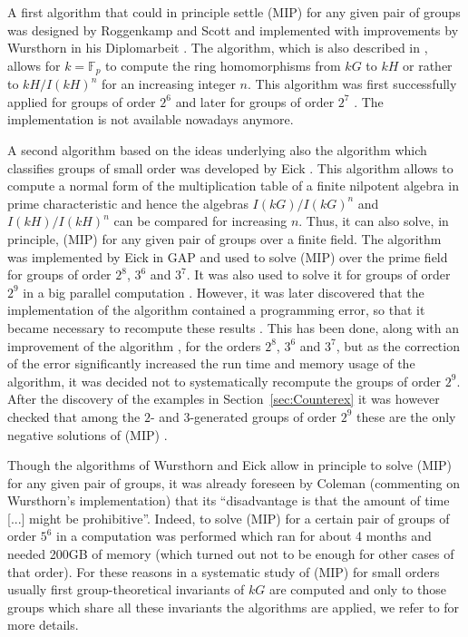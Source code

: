 \documentclass[11pt, a4paper]{amsart}
\theoremstyle{definition}
\begin{document}
A first algorithm that could in principle settle (MIP) for any given pair of groups was designed by Roggenkamp and Scott and implemented with improvements by Wursthorn in his Diplomarbeit \cite{Wursthorn90}. The algorithm, which is also described in \cite{Wursthorn93}, allows for $k = \mathbb{F}_p$ to compute the ring homomorphisms from $kG$ to $kH$ or rather to $kH/I(kH)^n$ for an increasing integer $n$. This algorithm was first successfully applied for groups of order $2^6$ \cite{Wursthorn93} and later for groups of order $2^7$ \cite{BleherKimmerleRoggenkampWursthorn99}. The implementation is not available nowadays anymore.

A second algorithm based on the ideas underlying also the algorithm which classifies groups of small order was developed by Eick \cite{Eick08}. This algorithm allows to compute a normal form of the multiplication table of a finite nilpotent algebra in prime characteristic and hence the algebras $I(kG)/I(kG)^n$ and $I(kH)/I(kH)^n$ can be compared for increasing $n$. Thus, it can also solve, in principle, (MIP) for any given pair of groups over a finite field. The algorithm was implemented by Eick in GAP \cite{ModIsom} and used to solve (MIP) over the prime field for groups of order $2^8$, $3^6$ and $3^7$. It was also used to solve it for groups of order $2^9$ in a big parallel computation \cite{EickKonovalov11}. However, it was later discovered that the implementation of the algorithm contained a programming error, so that it became necessary to recompute these results \cite{MargolisMoede}. This has been done, along with an improvement of the algorithm \cite{ModIsomExt}, for the orders $2^8$, $3^6$ and $3^7$, but as the correction of the error significantly increased the run time and memory usage of the algorithm, it was decided not to systematically recompute the groups of order $2^9$. After the discovery of the examples in Section~\ref{sec:Counterex} it was however checked that among the $2$- and $3$-generated groups of order $2^9$ these are the only negative solutions of (MIP) \cite{MargolisMoede}. 

Though the algorithms of Wursthorn and Eick allow in principle to solve (MIP) for any given pair of groups, it was already foreseen by Coleman (commenting on Wursthorn's implementation) that its ``disadvantage is that the amount of time [...] might be prohibitive''. Indeed, to solve (MIP) for a certain pair of groups of order $5^6$ in \cite{MargolisMoede} a computation was performed which ran for about 4 months and needed 200GB of memory (which turned out not to be enough for other cases of that order). For these reasons in a systematic study of (MIP) for small orders usually first group-theoretical invariants of $kG$ are computed and only to those groups which share all these invariants the algorithms are applied, we refer to \cite{Eick08, MargolisMoede} for more details. 
\end{document}
